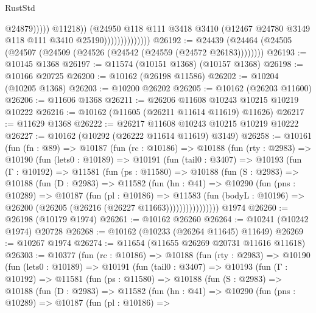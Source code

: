 \begin{lexlean}{RustStd}
\begin{coremodule}
                                          @24879)))))
                                @11218))
                            (@24950
                              @118
                              @111
                              @3418
                              @3410
                              (@12467 @24780 @3149 @118 @111 @3410 @25190))))))))))))))
@26192 := @24439 (@24464 (@24505 (@24507 (@24509 (@24526 (@24542 (@24559 (@24572 @26183))))))))
@26193 := @10145 @1368
@26197 := @11574 (@10151 @1368) (@10157 @1368)
@26198 := @10166 @20725
@26200 := @10162 (@26198 @11586)
@26202 := @10204 (@10205 @1368)
@26203 := @10200 @26202
@26205 := @10162 (@26203 @11600)
@26206 := @11606 @1368
@26211 := @26206 @11608 @10243 @10215 @10219 @10222
@26216 := @10162 (@11605 (@26211 @11614 @11619) @11626)
@26217 := @11629 @1368
@26222 := @26217 @11608 @10243 @10215 @10219 @10222
@26227 := @10162 (@10292 (@26222 @11614 @11619) @3149)
@26258 := @10161
    (fun (fn : @89) =>
    @10187
      (fun (rc : @10186) =>
      @10188
        (fun (rty : @2983) =>
        @10190
          (fun (lets0 : @10189) =>
          @10191
            (fun (tail0 : @3407) =>
            @10193
              (fun (Γ : @10192) =>
              @11581
                (fun (ps : @11580) =>
                @10188
                  (fun (S : @2983) =>
                  @10188
                    (fun (D : @2983) =>
                    @11582
                      (fun (hn : @41) =>
                      @10290
                        (fun (pns : @10289) =>
                        @10187
                          (fun (pl : @10186) =>
                          @11583
                            (fun (bodyL : @10196) =>
                            @26200 (@26205 (@26216 (@26227 @11663))))))))))))))))
    @1974
@26260 := @26198 (@10179 @1974)
@26261 := @10162 @26260
@26264 := @10241 (@10242 @1974) @20728
@26268 := @10162 (@10233 (@26264 @11645) @11649)
@26269 := @10267 @1974
@26274 := @11654 (@11655 @26269 @20731 @11616 @11618)
@26303 := @10377
    (fun (rc : @10186) =>
    @10188
      (fun (rty : @2983) =>
      @10190
        (fun (lets0 : @10189) =>
        @10191
          (fun (tail0 : @3407) =>
          @10193
            (fun (Γ : @10192) =>
            @11581
              (fun (ps : @11580) =>
              @10188
                (fun (S : @2983) =>
                @10188
                  (fun (D : @2983) =>
                  @11582
                    (fun (hn : @41) =>
                    @10290
                      (fun (pns : @10289) =>
                      @10187
                        (fun (pl : @10186) =>

\end{coremodule}
\end{lexlean}
